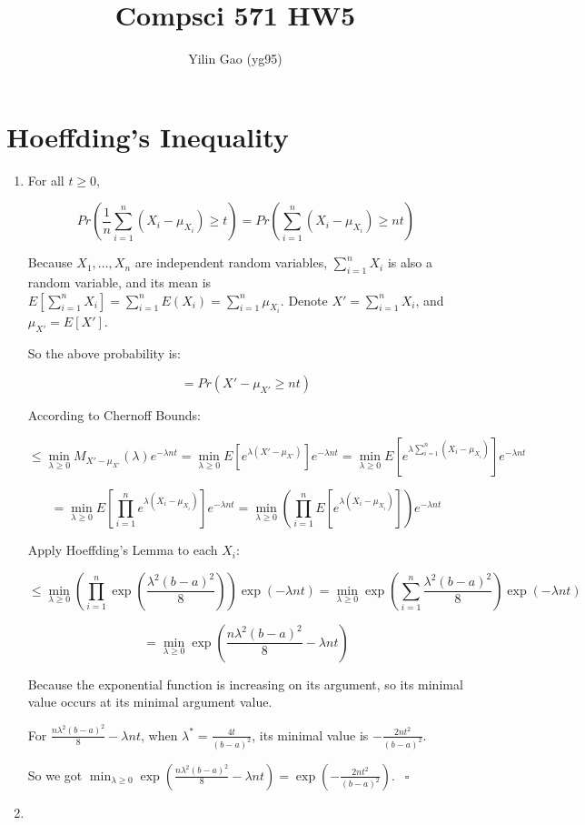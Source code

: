 \documentclass[paper=letter, fontsize=12pt]{article}
\title{Compsci 571 HW5}
\author{Yilin Gao (yg95)}
\begin{document}
\maketitle
\section{Hoeffding's Inequality}

\begin{enumerate}[label=(\alph*)]
	\item 
	For all $t \geq 0$,
	
	$$Pr(\frac{1}{n}\sum_{i=1}^{n}(X_i-\mu_{X_i})\geq t) = Pr(\sum_{i =1}^{n} (X_i - \mu_{X_i}) \geq nt)$$
	
	Because $X_1, \dots, X_n$ are independent random variables, $\sum_{i = 1}^{n} X_i$ is also a random variable, and its mean is $E[\sum_{i = 1}^{n} X_i] = \sum_{i = 1}^{n} E(X_i) = \sum_{i = 1}^{n} \mu_{X_i}$. Denote $X' = \sum_{i = 1}^{n} X_i$, and $\mu_{X'} = E[X']$.
	
	So the above probability is:
	
	$$ = Pr(X' - \mu_{X'} \geq nt)$$

	According to Chernoff Bounds:
	
	$$\leq \min_{\lambda \geq 0} M_{X' - \mu_{X'}} (\lambda) e^{-\lambda nt} = \min_{\lambda \geq 0} E[e^{\lambda (X' - \mu_{X'})}] e^{-\lambda nt} = \min_{\lambda \geq 0} E[e^{\lambda \sum_{i = 1}^{n}(X_i - \mu_{X_i})}] e^{-\lambda nt}$$	
	
	$$= \min_{\lambda \geq 0} E[\prod_{i = 1}^{n} e^{\lambda (X_i - \mu_{X_i})}] e^{-\lambda nt} = \min_{\lambda \geq 0} (\prod_{i = 1}^{n} E[e^{\lambda (X_i - \mu_{X_i})}]) e^{-\lambda nt}$$
	
	Apply Hoeffding's Lemma to each $X_i$:
	
	$$\leq \min_{\lambda \geq 0} ( \prod_{i = 1}^{n} \exp(\frac{\lambda^2 (b-a)^2}{8})) \exp(-\lambda nt) = \min_{\lambda \geq 0} \exp(\sum_{i = 1}^{n} \frac{\lambda^2(b-a)^2}{8}) \exp(-\lambda nt)$$
	
	$$= \min_{\lambda \geq 0} \exp(\frac{n \lambda^2 (b-a)^2}{8} - \lambda nt)$$
	
	Because the exponential function is increasing on its argument, so its minimal value occurs at its minimal argument value.
	
	For $\frac{n \lambda^2 (b-a)^2}{8} - \lambda nt$, when $\lambda^* = \frac{4t}{(b-a)^2}$, its minimal value is $- \frac{2nt^2}{(b-a)^2}$.
	
	So we got $\min_{\lambda \geq 0} \exp(\frac{n \lambda^2 (b-a)^2}{8} - \lambda nt) = \exp(- \frac{2nt^2}{(b-a)^2})$. $\ \ \square$
	\item
\end{enumerate}
\end{document}
